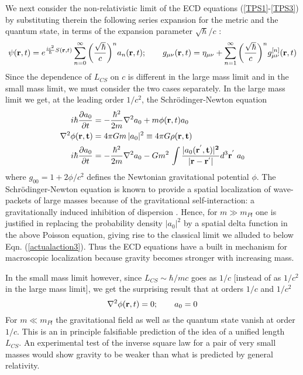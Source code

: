 \documentclass[prd, preprint, 12pt]{revtex4-1}
\begin{document}
  We next consider the non-relativistic limit of the ECD equations (\ref{TPS1}-\ref{TPS3}) by substituting therein the following series expansion for the metric and the quantum state, in terms of the expansion parameter $\sqrt{\hbar}/c$ \cite{Swanand1, Swanand2}:
 \begin{equation}\label{eq:Spinor_ansatz_NRlimit}
	\psi(\textbf{r},t) = e^{\frac{ic^2}{\hbar}S(\textbf{r},t)}\sum_{n=0}^{\infty}\bigg(\frac{\sqrt{\hbar}}{c}\bigg)^n a_n(\textbf{r},t)
	; \qquad 
	g_{\mu\nu}({\bf r}, t) = \eta_{\mu\nu} + \sum_{n = 1}^{\infty} \bigg{(}\frac{\sqrt{\hbar}}{c} \bigg{)}^n g_{\mu\nu}^{[n]}({\bf r}, t)
	\end{equation}  
	Since the dependence of $L_{CS}$ on $c$ is different in the large mass limit and in the small mass limit, we must consider the two cases separately. In the large mass limit we get, at the leading order $1/c^2$, the Schr\"{o}dinger-Newton equation
 \begin{align}
i\hbar\frac{\partial a_0}{\partial t} &= -\frac{\hbar^2}{2m} \nabla^2 a_0 + m \phi({\bf r},t) a_0 \\
\nabla^2\phi(\bf{r},t) &= 4\pi G m\, |a_{0}|^2 \equiv 4\pi G \rho(\bf{r},t)\\
i\hbar\frac{\partial a_0}{\partial t} &= -\frac{\hbar^2}{2m} \nabla^2 a_0  - G m^2\,\int \frac{|a_{0}(\bf{r}^{'}, t)|^2}{|\bf{r} - \bf{r}^{'}|}d^3{\bf r}^{'}\; a_0
\end{align}
where $g_{00}= 1+2\phi/c^2$ defines the Newtonian gravitational potential $\phi$. The Schr\"odinger-Newton equation is known to provide a  spatial localization of wave-packets of large masses because of the gravitational self-interaction: a gravitationally induced inhibition of dispersion \cite{Giulini}. Hence, for $m\gg m_{Pl}$ one is justified in replacing the probability density $|a_0|^2$ by a spatial delta function in the above Poisson equation, giving rise to the classical limit we alluded to below Eqn. (\ref{actualaction3}). Thus the ECD equations have a built in mechanism for macroscopic localization because gravity becomes stronger with increasing mass.

In the small mass limit however, since $L_{CS}\sim \hbar/mc$ goes as $1/c$ [instead of as $1/c^2$ in the large mass limit], we get the surprising result that at orders $1/c$ and $1/c^2$
\begin{equation}
\nabla^2\phi({\bf r},t) =0; \qquad a_0 =0
\end{equation}
For $m\ll m_{Pl}$ the gravitational field as well as the quantum state vanish at order $1/c$. This is an in principle falsifiable prediction of the idea of a unified length $L_{CS}$. An experimental test of the inverse square law for a pair of very small masses would show gravity to be weaker than what is predicted by general relativity.
\end{document}
